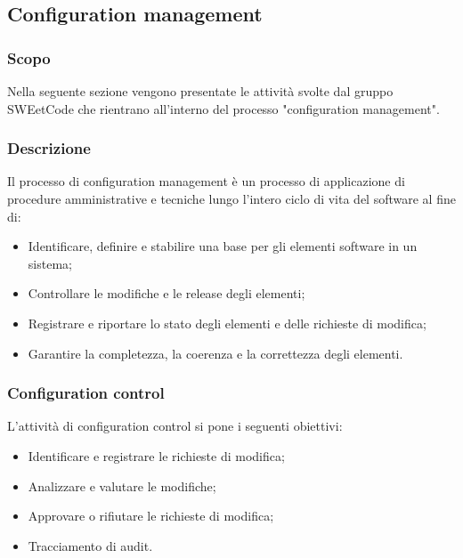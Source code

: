 \documentclass[10pt, a4paper]{article}
\begin{document}
\subsection{Configuration management}

\subsubsection{Scopo}
Nella seguente sezione vengono presentate le attività svolte dal gruppo SWEetCode che rientrano all'interno del processo "configuration management".

\subsubsection{Descrizione}
Il processo di configuration management è un processo di applicazione di procedure amministrative e tecniche lungo l'intero ciclo di vita del software al fine di:
\begin{itemize}
    \item Identificare, definire e stabilire una base per gli elementi software in un sistema;
    \item Controllare le modifiche e le release degli elementi;
    \item Registrare e riportare lo stato degli elementi e delle richieste di modifica;
    \item Garantire la completezza, la coerenza e la correttezza degli elementi.
\end{itemize}

\subsubsection{Configuration control}
L'attività di configuration control si pone i seguenti obiettivi:
\begin{itemize}
    \item Identificare e registrare le richieste di modifica;
    \item Analizzare e valutare le modifiche;
    \item Approvare o rifiutare le richieste di modifica;
    \item Tracciamento di audit.
\end{itemize}
\end{document}
